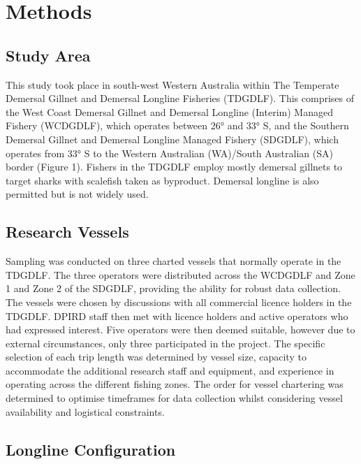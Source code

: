 \documentclass[preprint, 3p,
authoryear]{elsarticle} %
\begin{document}
\hypertarget{methods}{%
\section{Methods}\label{methods}}

\hypertarget{study-area}{%
\subsection{Study Area}\label{study-area}}

This study took place in south-west Western Australia within The
Temperate Demersal Gillnet and Demersal Longline Fisheries (TDGDLF).
This comprises of the West Coast Demersal Gillnet and Demersal Longline
(Interim) Managed Fishery (WCDGDLF), which operates between 26° and 33°
S, and the Southern Demersal Gillnet and Demersal Longline Managed
Fishery (SDGDLF), which operates from 33° S to the Western Australian
(WA)/South Australian (SA) border (Figure 1). Fishers in the TDGDLF
employ mostly demersal gillnets to target sharks with scalefish taken as
byproduct. Demersal longline is also permitted but is not widely used.

\hypertarget{research-vessels}{%
\subsection{Research Vessels}\label{research-vessels}}

Sampling was conducted on three charted vessels that normally operate in
the TDGDLF. The three operators were distributed across the WCDGDLF and
Zone 1 and Zone 2 of the SDGDLF, providing the ability for robust data
collection. The vessels were chosen by discussions with all commercial
licence holders in the TDGDLF. DPIRD staff then met with licence holders
and active operators who had expressed interest. Five operators were
then deemed suitable, however due to external circumstances, only three
participated in the project. The specific selection of each trip length
was determined by vessel size, capacity to accommodate the additional
research staff and equipment, and experience in operating across the
different fishing zones. The order for vessel chartering was determined
to optimise timeframes for data collection whilst considering vessel
availability and logistical constraints.

\hypertarget{longline-configuration}{%
\subsection{Longline Configuration}\label{longline-configuration}}
\end{document}
